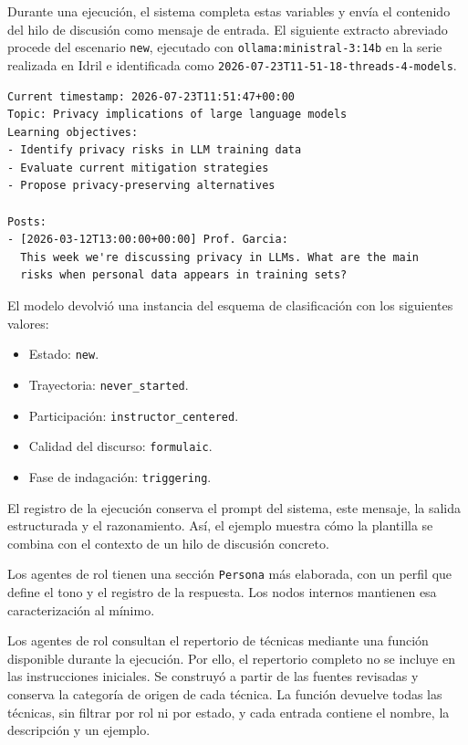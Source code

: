 Durante una ejecución, el sistema completa estas variables y envía el contenido del hilo de discusión como mensaje de entrada. El siguiente extracto abreviado procede del escenario \texttt{new}, ejecutado con \texttt{ollama:ministral-3:14b} en la serie realizada en Idril e identificada como \texttt{2026-07-23T11-51-18-threads-4-models}.

\begin{small}
\begin{verbatim}
Current timestamp: 2026-07-23T11:51:47+00:00
Topic: Privacy implications of large language models
Learning objectives:
- Identify privacy risks in LLM training data
- Evaluate current mitigation strategies
- Propose privacy-preserving alternatives

Posts:
- [2026-03-12T13:00:00+00:00] Prof. Garcia:
  This week we're discussing privacy in LLMs. What are the main
  risks when personal data appears in training sets?
\end{verbatim}
\end{small}

El modelo devolvió una instancia del esquema de clasificación con los siguientes valores:

\begin{itemize}
  \item Estado: \texttt{new}.
  \item Trayectoria: \texttt{never\_started}.
  \item Participación: \texttt{instructor\_centered}.
  \item Calidad del discurso: \texttt{formulaic}.
  \item Fase de indagación: \texttt{triggering}.
\end{itemize}

El registro de la ejecución conserva el prompt del sistema, este mensaje, la salida estructurada y el razonamiento. Así, el ejemplo muestra cómo la plantilla se combina con el contexto de un hilo de discusión concreto.

Los agentes de rol tienen una sección \texttt{Persona} más elaborada, con un perfil que define el tono y el registro de la respuesta. Los nodos internos mantienen esa caracterización al mínimo.

Los agentes de rol consultan el repertorio de técnicas mediante una función disponible durante la ejecución. Por ello, el repertorio completo no se incluye en las instrucciones iniciales. Se construyó a partir de las fuentes revisadas y conserva la categoría de origen de cada técnica. La función devuelve todas las técnicas, sin filtrar por rol ni por estado, y cada entrada contiene el nombre, la descripción y un ejemplo.

